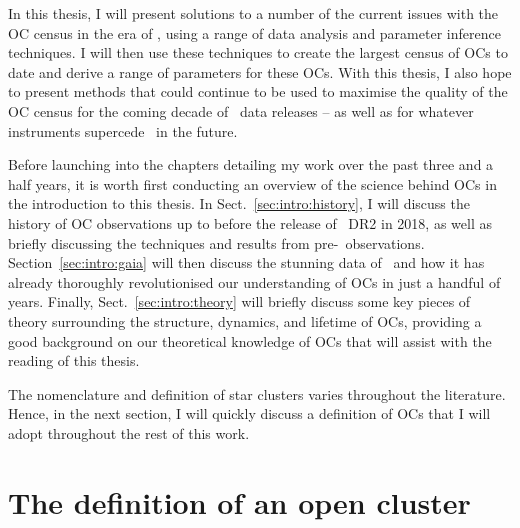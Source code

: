 In this thesis, I will present solutions to a number of the current issues with the OC census in the era of \gaia, using a range of data analysis and parameter inference techniques. I will then use these techniques to create the largest census of OCs to date and derive a range of parameters for these OCs. With this thesis, I also hope to present methods that could continue to be used to maximise the quality of the OC census for the coming decade of \gaia\ data releases -- as well as for whatever instruments supercede \gaia\ in the future.

Before launching into the chapters detailing my work over the past three and a half years, it is worth first conducting an overview of the science behind OCs in the introduction to this thesis. In Sect.~\ref{sec:intro:history}, I will discuss the history of OC observations up to before the release of \gaia\ DR2 in 2018, as well as briefly discussing the techniques and results from pre-\gaia\ observations. Section~\ref{sec:intro:gaia} will then discuss the stunning data of \gaia\ and how it has already thoroughly revolutionised our understanding of OCs in just a handful of years. Finally, Sect.~\ref{sec:intro:theory} will briefly discuss some key pieces of theory surrounding the structure, dynamics, and lifetime of OCs, providing a good background on our theoretical knowledge of OCs that will assist with the reading of this thesis.

The nomenclature and definition of star clusters varies throughout the literature. Hence, in the next section, I will quickly discuss a definition of OCs that I will adopt throughout the rest of this work.


\section{The definition of an open cluster}
\label{sec:intro:definition}

